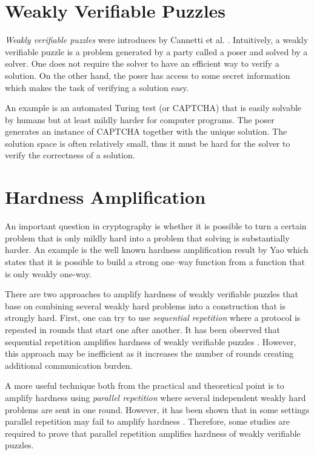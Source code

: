 \section{Weakly Verifiable Puzzles}
\textit{Weakly verifiable puzzles} were introduces by Cannetti et al. \cite{canetti2005hardness}.
Intuitively, a weakly verifiable puzzle is a problem generated by a party called a poser
and solved by a solver. One does not require the solver to have an efficient way to verify a solution.
On the other hand, the poser has access to some secret information which makes the task of verifying a solution easy.

An example is an automated Turing test (or CAPTCHA) \cite{von2003captcha} that is easily solvable by humans
but at least mildly harder for computer programs. The poser generates an instance of CAPTCHA together with the unique solution.
The solution space is often relatively small, thus it must be hard for the solver to verify the correctness of a solution.

\section{Hardness Amplification}
An important question in cryptography is whether it is possible to turn a certain problem
that is only mildly hard into a problem that solving is substantially harder.
An example is the well known hardness amplification result by Yao \cite{Goldreich:2000:FCB:519078}
which states that it is possible to build a strong one--way function from a function that is only weakly one-way.

There are two approaches to amplify hardness of weakly verifiable puzzles that base on combining several weakly hard problems into
a construction that is strongly hard. First, one can try to use \textit{sequential repetition} where a protocol is repeated
in rounds that start one after another. It has been observed that sequential repetition amplifies hardness
of weakly verifiable puzzles \cite{von2003captcha}. However, this approach may be inefficient as it increases
the number of rounds creating additional communication burden.

A more useful technique both from the practical and theoretical point is to amplify hardness using \textit{parallel repetition}
where several independent weakly hard problems are sent in one round.
However, it has been shown that in some settings parallel repetition may fail to amplify hardness \cite{bellare1997does}.
Therefore, some studies are required to prove that parallel repetition amplifies hardness
of weakly verifiable puzzles.

